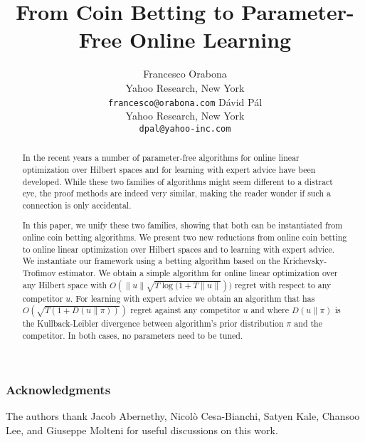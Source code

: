 \documentclass{article}
\author{
  Francesco Orabona\\
  Yahoo Research, New York\\
  \texttt{francesco@orabona.com}
  \And
  D\'avid P\'al\\
  Yahoo Research, New York\\
  \texttt{dpal@yahoo-inc.com}
}
\title{From Coin Betting to Parameter-Free Online Learning}
\newcommand{\KL}[2]{D\left({#1}\middle\|{#2}\right)}  %
\newcommand{\norm}[1]{\left\|{#1}\right\|}
\begin{document}
\maketitle

\begin{abstract}
In the recent years a number of parameter-free algorithms for online linear
optimization over Hilbert spaces and for learning with expert advice have been
developed. While these two families of algorithms might seem different to a
distract eye, the proof methods are indeed very similar, making the reader
wonder if such a connection is only accidental.

In this paper, we unify these two families, showing that both can be
instantiated from online coin betting algorithms. We present two new reductions
from online coin betting to online linear optimization over Hilbert spaces and
to learning with expert advice. We instantiate our framework using a betting
algorithm based on the Krichevsky-Trofimov estimator. We obtain a simple
algorithm for online linear optimization over any Hilbert space with
$O(\norm{u}\sqrt{T \log(1+T \norm{u}}))$ regret with respect to any competitor
$u$. For learning with expert advice we obtain an algorithm that has $O(\sqrt{T
(1 + \KL{u}{\pi})})$ regret against any competitor $u$ and where $\KL{u}{\pi}$
is the Kullback-Leibler divergence between algorithm's prior distribution $\pi$
and the competitor. In both cases, no parameters need to be tuned.
\end{abstract}










\subsubsection*{Acknowledgments}
The authors thank Jacob Abernethy, Nicol\`{o} Cesa-Bianchi, Satyen Kale,
Chansoo Lee, and  Giuseppe Molteni for useful discussions on this work.




\appendix




\end{document}
